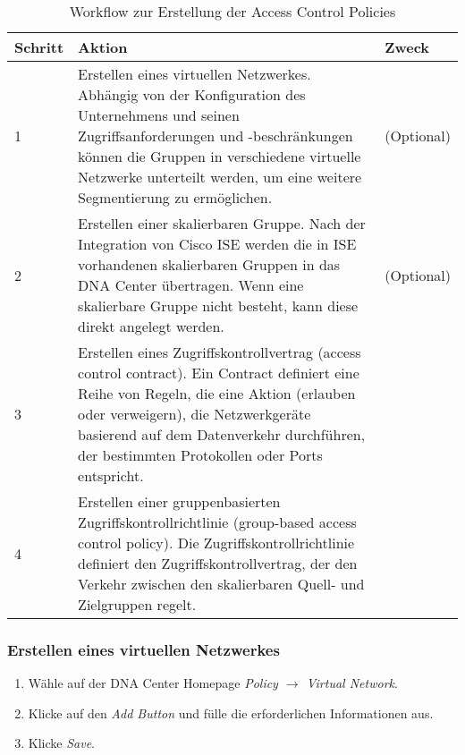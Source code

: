 \begin{table}[H]
	\centering
	\begin{tabularx}{\textwidth}{p{2 cm} | X | p{2 cm}}
		\rowcolor{gray!50}
		\textbf{Schritt} & \textbf{Aktion} & \textbf{Zweck} \\
		\hline	
		1 & Erstellen eines virtuellen Netzwerkes. Abhängig von der Konfiguration des Unternehmens und seinen Zugriffsanforderungen und -beschränkungen können die Gruppen in verschiedene virtuelle Netzwerke unterteilt werden, um eine weitere Segmentierung zu ermöglichen. & (Optional) \\
		2 & Erstellen einer skalierbaren Gruppe. Nach der Integration von Cisco ISE werden die in ISE vorhandenen skalierbaren Gruppen in das DNA Center übertragen. Wenn eine skalierbare Gruppe nicht besteht, kann diese direkt angelegt werden. & (Optional) \\
		3 & Erstellen eines Zugriffskontrollvertrag (access control contract). Ein Contract definiert eine Reihe von Regeln, die eine Aktion (erlauben oder verweigern), die Netzwerkgeräte basierend auf dem Datenverkehr durchführen, der bestimmten Protokollen oder Ports entspricht. & \\
		4 & Erstellen einer gruppenbasierten Zugriffskontrollrichtlinie (group-based access control policy). Die Zugriffskontrollrichtlinie definiert den Zugriffskontrollvertrag, der den Verkehr zwischen den skalierbaren Quell- und Zielgruppen regelt. & \\
		
	\end{tabularx}
	\caption{Workflow zur Erstellung der Access Control Policies}
	\label{tab:Workflow zur Erstellung der Access Control Policies}
\end{table}

\subsubsection{Erstellen eines virtuellen Netzwerkes}
\begin{enumerate}
	\item Wähle auf der DNA Center Homepage \textit{Policy $\rightarrow$ Virtual Network}.
	\item Klicke auf den \textit{Add Button} und fülle die erforderlichen Informationen aus.
	\item Klicke \textit{Save}.
\end{enumerate}

